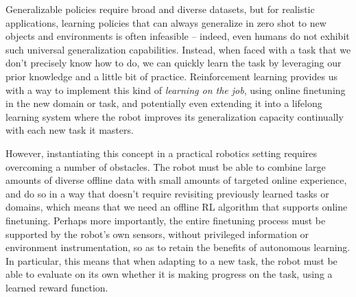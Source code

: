 Generalizable policies require broad and diverse datasets, but for realistic applications, learning policies that can always generalize in zero shot to new objects and environments is often infeasible -- indeed, even humans do not exhibit such universal generalization capabilities. Instead, when faced with a task that we don't precisely know how to do, we can quickly learn the task by leveraging our prior knowledge and a little bit of practice. Reinforcement learning provides us with a way to implement this kind of \textit{learning on the job}, using online finetuning in the new domain or task, and potentially even extending it into a lifelong learning system where the robot improves its generalization capacity continually with each new task it masters.

However, instantiating this concept in a practical robotics setting requires overcoming a number of obstacles. The robot must be able to combine large amounts of diverse offline data with small amounts of targeted online experience, and do so in a way that doesn't require revisiting previously learned tasks or domains, which means that we need an offline RL algorithm that supports online finetuning. Perhaps more importantly, the entire finetuning process must be supported by the robot's own sensors, without privileged information or environment instrumentation, so as to retain the benefits of autonomous learning. In particular, this means that when adapting to a new task, the robot must be able to evaluate on its own whether it is making progress on the task, using a learned reward function.

